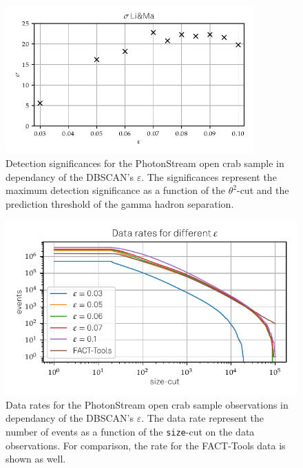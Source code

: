 %
\begin{figure}
  \centering
  \includegraphics[width=0.85\textwidth]{Plots/Epsilon/eps_sigma.pdf}
  \caption{Detection significances for the PhotonStream open crab sample in dependancy of the DBSCAN's $\varepsilon$. The significances represent the maximum detection significance as a function of the $\theta^2$-cut and the prediction threshold of the gamma hadron separation.}
  \label{fig:eps_sigma}
\end{figure}
%
%
\begin{figure}
  \centering
  \includegraphics[width=\textwidth]{Plots/data_rates_eps.pdf}
  \caption{Data rates for the PhotonStream open crab sample observations in dependancy of the DBSCAN's $\varepsilon$. The data rate represent the number of events as a function of the \texttt{size}-cut on the data observations. For comparison, the rate for the FACT-Tools data is shown as well.}
  \label{fig:eps_rate}
\end{figure}
%
